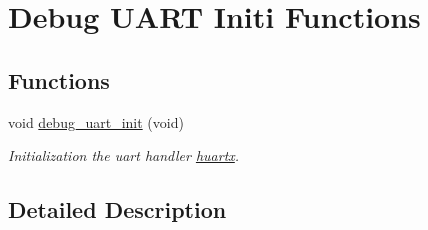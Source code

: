 \hypertarget{group___debug___uart___exported___functions___group1}{}\section{Debug U\+A\+RT Initi Functions}
\label{group___debug___uart___exported___functions___group1}
\subsection*{Functions}
\begin{DoxyCompactItemize}
\item 
void \hyperlink{group___debug___uart___exported___functions___group1_gac5743e072f3f4b6a6c935611f51bbb47}{debug\+\_\+uart\+\_\+init} (void)\hypertarget{group___debug___uart___exported___functions___group1_gac5743e072f3f4b6a6c935611f51bbb47}{}\label{group___debug___uart___exported___functions___group1_gac5743e072f3f4b6a6c935611f51bbb47}

\begin{DoxyCompactList}\small\item\em Initialization the uart handler \hyperlink{group___debug___u_a_r_t___external___variables_ga988a2019125e3bb8e49b1f9195646bc6}{huartx}. \end{DoxyCompactList}\end{DoxyCompactItemize}


\subsection{Detailed Description}
